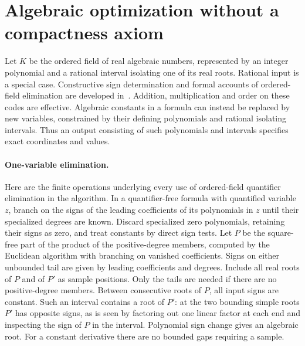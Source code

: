 \documentclass[10pt,letterpaper]{article}
\begin{document}
\section{Algebraic optimization without a compactness axiom}
\label{sec:algebraic}
Let $K$ be the ordered field of real algebraic numbers, represented by an
integer polynomial and a rational interval isolating one of its real roots.
Rational input is a special case. Constructive sign determination and formal accounts of ordered-field elimination are developed in~\cite{qe}. Addition, multiplication and order on
these codes are effective. Algebraic constants in a formula can instead
be replaced by new variables, constrained by their defining polynomials
and rational isolating intervals. Thus an output consisting of such
polynomials and intervals specifies exact coordinates and values.

\paragraph{One-variable elimination.}
Here are the finite operations underlying every use of ordered-field
quantifier elimination in the algorithm. In a quantifier-free formula
with quantified variable $z$, branch on the signs of the leading
coefficients of its polynomials in $z$ until their specialized degrees
are known. Discard specialized zero polynomials, retaining their
signs as zero, and treat constants by direct sign tests. Let $P$ be
the square-free part of the product of the positive-degree members,
computed by the Euclidean algorithm with branching on vanished
coefficients. Signs on either unbounded tail are given by leading
coefficients and degrees. Include all real roots of $P$ and of $P'$ as
sample positions. Only the tails are needed if there are no
positive-degree members. Between consecutive roots of $P$, all input
signs are constant. Such an interval contains a root of $P'$:
at the two bounding simple roots $P'$ has opposite signs, as is seen
by factoring out one linear factor at each end and inspecting the sign
of $P$ in the interval. Polynomial sign change gives an algebraic root.
For a constant derivative there are no bounded gaps requiring a sample.
\end{document}
